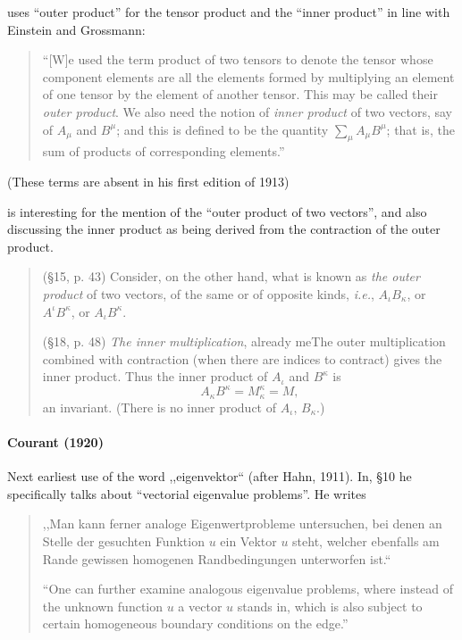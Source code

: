 \cite[p. 87]{Carmichael1920} uses ``outer product'' for the tensor product and the ``inner product'' in line with Einstein and Grossmann:
\begin{quote}
``[W]e used the term product of two tensors to denote the tensor whose component elements are all the elements formed by multiplying an element of one tensor by the element of another tensor. This may be called their \textit{outer product}. We also need the notion of \textit{inner product} of two vectors, say of $A_\mu$ and $B^\mu$; and this is defined to be the quantity $\sum_\mu A_\mu B^\mu$; that is, the sum of products of corresponding elements.''
\end{quote}
(These terms are absent in his first edition of 1913)

\cite{Silberstein1922} is interesting for the mention of the ``outer product of two vectors'', and also discussing the inner product as being derived from the contraction of the outer product.
\begin{quote}
(\S 15, p. 43) Consider, on the other hand, what is known as \textit{the outer product} of two vectors, of the same or of opposite kinds, \textit{i.e.}, $A_\iota B_\kappa$, or $A^\iota B^\kappa$, or $A_\iota B^\kappa$.

(\S 18, p. 48) \textit{The inner multiplication}, already meThe outer multiplication combined with contraction (when there are indices to contract) gives the inner product. Thus the inner product of $A_\iota$ and $B^\kappa$ is
\[
A_\kappa B^\kappa = M^\kappa_\kappa = M,
\]
an invariant. (There is no inner product of $A_\iota$, $B_\kappa$.)
\end{quote}



\paragraph{Courant (1920)}

Next earliest use of the word ,,eigenvektor`` (after Hahn, 1911).
In, \S 10 he specifically talks about ``vectorial eigenvalue problems''. He
writes

\begin{quote}
,,Man kann ferner analoge Eigenwertprobleme untersuchen, bei denen an Stelle
der gesuchten Funktion $u$ ein Vektor $u$ steht, welcher ebenfalls am Rande
gewissen homogenen Randbedingungen unterworfen ist.``

``One can further examine analogous eigenvalue problems, where instead of the
unknown function $u$ a vector $u$ stands in, which is also subject to certain
homogeneous boundary conditions on the edge.''
\end{quote}

